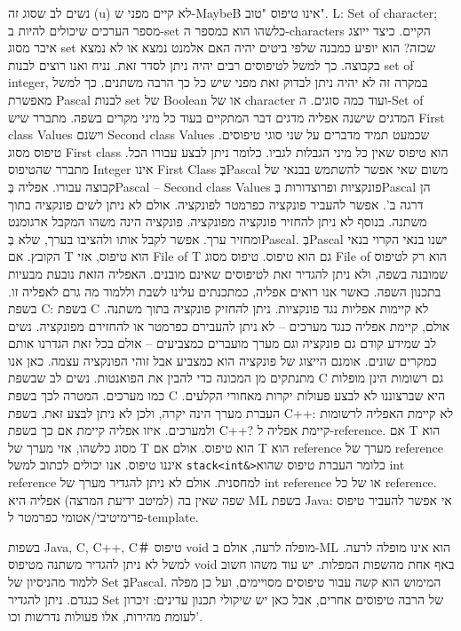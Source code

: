       נשים לב שסוג זה (u) לא קיים מפני ש-MaybeB אינו טיפוס "טוב".
      L: Set of character;
      מספר הערכים שיכולים להיות ב-set כלשהו הוא כמספר ה-characters הקיים.
      כיצד ייוצג איבר מסוג set שכזה? הוא יופיע כמבנה שלפי ביטים יהיה האם אלמנט נמצא או לא נמצא בקבוצה.
      כך למשל לטיפוסים רבים יהיה ניתן לסדר זאת.
      נניח ואנו רוצים לבנות set of integer, במקרה זה לא יהיה ניתן לבדוק זאת מפני שיש כל כך הרבה משתנים.
      כך למשל מאפשרת Pascal לבנות set של Boolean או של character ועוד כמה סוגים.
      ה-Set of המדגים שישנה אפליה מדגים דבר המתקיים בעוד כל מיני מקרים בשפה.
      מתברר שיש First class Values וישנם Second class Values שכמעט תמיד מדברים על שני סוגי טיפוסים.
      טיפוס מסוג First class הוא טיפוס שאין כל מיני הגבלות לגביו. כלומר ניתן לבצע עבורו הכל.
      מתברר שהטיפוס Integer אינו First Class בְּPascal משום שאי אפשר להשתמש בבנאי של קבוצה עבורו.
      אפליה בְּPascal – Second class Values פונקציות ופרוצדורות בְּPascal הן דרגה ב'. אפשר להעביר פונקציה כפרמטר לפונקציה. אולם לא ניתן לשים פונקציה בתוך משתנה. בנוסף לא ניתן להחזיר פונקציה מפונקציה.
      פונקציה הינה משהו המקבל ארגומנט ומחזיר ערך. אפשר לקבל אותו ולהציבו בערך, שלא בְּPascal.
      בְּPascal ישנו בנאי הקרוי בנאי הקובץ. אם T הוא טיפוס, אזי File of T גם הוא טיפוס. טיפוס מסוג File of הוא רק לטיפוס שמובנה בשפה, ולא ניתן להגדיר זאת לטיפוסים שאינם מובנים. האפליה הזאת נובעת מבעיות בתכנון השפה.
      כאשר אנו רואים אפליה, כמתכנתים עלינו לשבת וללמוד מה גרם לאפליה זו.
      בשפת C:
      בשפת C לא קיימות אפליות נגד פונקציות. ניתן להחזיק פונקציה בתוך משתנה.
      אולם, קיימת אפליה כנגד מערכים – לא ניתן להעבירם כפרמטר או להחזירם מפונקציה.
      נשים לב שמידע קודם גם פונקציה וגם מערך מועברים כמצביעים – אולם בכל זאת הגדרנו אותם כמקרים שונים. אומנם הייצוג של פונקציה הוא כמצביע אבל זוהי הפונקציה עצמה. כאן אנו מתנתקים מן המכונה כדי להבין את הפואנטות.
      נשים לב שבשפת C גם רשומות הינן מופלות כמו מערכים.
      המטרה לכך בשפת C היא שברצוננו לא לבצע פעולות יקרות מאחורי הקלעים. העברת מערך הינה יקרה, ולכן לא ניתן לבצע זאת.
      בשפת C++:
      לא קיימת האפליה לרשומות ולמערכים. איזו אפליה קיימת אם כך בשפת C++? קיימת אפליה ל-reference.
      אם T הוא מסוג כלשהו, אזי מערך של T הוא טיפוס. אולם אם T הוא reference מערך של reference איננו טיפוס.
      אנו יכולים לכתוב למשל \verb+stack<int&>+כלומר העברת טיפוס שהוא int reference למחסנית. אולם לא ניתן להגדיר מערך של int reference או של כל reference.
      שפה שאין בה (למיטב ידיעת המרצה) אפליה היא ML
      בשפת Java:
      אי אפשר להעביר טיפוס פרימיטיבי/אטומי כפרמטר ל-template.

      בשפות Java, C, C++, C＃ טיפוס void מופלה לרעה, אולם ב-ML הוא אינו מופלה לרעה. למשל לא ניתן להגדיר משתנה מטיפוס void באף אחת מהשפות המפלות.
      יש עוד משהו חשוב ללמוד מהניסיון של Set בְּPascal. המימוש הוא קשה עבור טיפוסים מסויימים, ועל כן מפלה כנגדם. ניתן להגדיר Set של הרבה טיפוסים אחרים, אבל כאן יש שיקולי תכנון עדינים: זיכרון לעומת מהירות, אלו פעולות נדרשות וכו'.

